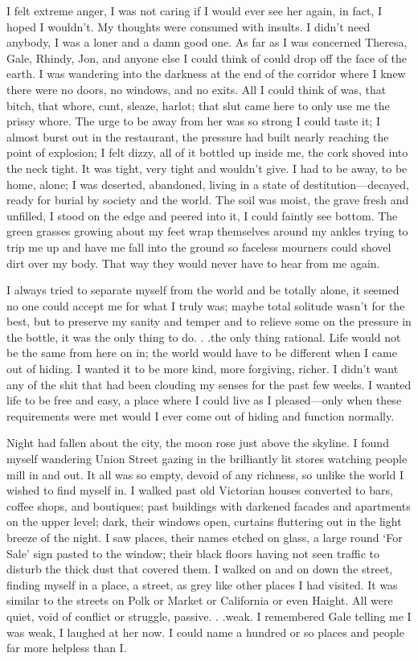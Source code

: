 I felt extreme anger, I was not caring if I would ever see her again, in
fact, I hoped I wouldn't. My thoughts were consumed with insults. I
didn't need anybody, I was a loner and a damn good one. As far as I was
concerned Theresa, Gale, Rhindy, Jon, and anyone else I could think of
could drop off the face of the earth. I was wandering into the darkness
at the end of the corridor where I knew there were no doors, no windows,
and no exits. All I could think of was, that bitch, that whore, cunt,
sleaze, harlot; that slut came here to only use me the prissy whore. The
urge to be away from her was so strong I could taste it; I almost burst
out in the restaurant, the pressure had built nearly reaching the point
of explosion; I felt dizzy, all of it bottled up inside me, the cork
shoved into the neck tight. It was tight, very tight and wouldn't give.
I had to be away, to be home, alone; I was deserted, abandoned, living
in a state of destitution---decayed, ready for burial by society and the
world. The soil was moist, the grave fresh and unfilled, I stood on the
edge and peered into it, I could faintly see bottom. The green grasses
growing about my feet wrap themselves around my ankles trying to trip me
up and have me fall into the ground so faceless mourners could shovel
dirt over my body. That way they would never have to hear from me again.

I always tried to separate myself from the world and be totally alone,
it seemed no one could accept me for what I truly was; maybe total
solitude wasn't for the best, but to preserve my sanity and temper and
to relieve some on the pressure in the bottle, it was the only thing to
do. . .the only thing rational. Life would not be the same from here on
in; the world would have to be different when I came out of hiding. I
wanted it to be more kind, more forgiving, richer. I didn't want any of
the shit that had been clouding my senses for the past few weeks. I
wanted life to be free and easy, a place where I could live as I
pleased---only when these requirements were met would I ever come out of
hiding and function normally.

Night had fallen about the city, the moon rose just above the skyline. I
found myself wandering Union Street gazing in the brilliantly lit stores
watching people mill in and out. It all was so empty, devoid of any
richness, so unlike the world I wished to find myself in. I walked past
old Victorian houses converted to bars, coffee shops, and boutiques;
past buildings with darkened facades and apartments on the upper level;
dark, their windows open, curtains fluttering out in the light breeze of
the night. I saw places, their names etched on glass, a large round `For
Sale' sign pasted to the window; their black floors having not seen
traffic to disturb the thick dust that covered them. I walked on and on
down the street, finding myself in a place, a street, as grey like other
places I had visited. It was similar to the streets on Polk or Market or
California or even Haight. All were quiet, void of conflict or struggle,
passive. . .weak. I remembered Gale telling me I was weak, I laughed at
her now. I could name a hundred or so places and people far more
helpless than I.


